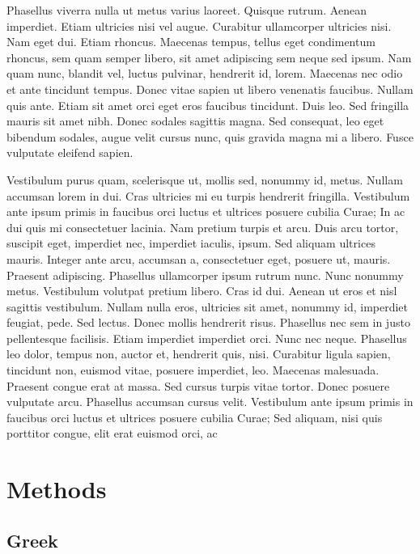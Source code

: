 \documentclass[]{cik}%
\begin{document}
Phasellus viverra nulla ut metus varius laoreet. Quisque rutrum. Aenean
imperdiet. Etiam ultricies nisi vel augue. Curabitur ullamcorper
ultricies nisi. Nam eget dui. Etiam rhoncus. Maecenas tempus, tellus
eget condimentum rhoncus, sem quam semper libero, sit amet adipiscing
sem neque sed ipsum. Nam quam nunc, blandit vel, luctus pulvinar,
hendrerit id, lorem. Maecenas nec odio et ante tincidunt tempus. Donec
vitae sapien ut libero venenatis faucibus. Nullam quis ante. Etiam sit
amet orci eget eros faucibus tincidunt. Duis leo. Sed fringilla mauris
sit amet nibh. Donec sodales sagittis magna. Sed consequat, leo eget
bibendum sodales, augue velit cursus nunc, quis gravida magna mi a
libero. Fusce vulputate eleifend sapien.

Vestibulum purus quam, scelerisque ut, mollis sed, nonummy id, metus.
Nullam accumsan lorem in dui. Cras ultricies mi eu turpis hendrerit
fringilla. Vestibulum ante ipsum primis in faucibus orci luctus et
ultrices posuere cubilia Curae; In ac dui quis mi consectetuer lacinia.
Nam pretium turpis et arcu. Duis arcu tortor, suscipit eget, imperdiet
nec, imperdiet iaculis, ipsum. Sed aliquam ultrices mauris. Integer ante
arcu, accumsan a, consectetuer eget, posuere ut, mauris. Praesent
adipiscing. Phasellus ullamcorper ipsum rutrum nunc. Nunc nonummy metus.
Vestibulum volutpat pretium libero. Cras id dui. Aenean ut eros et nisl
sagittis vestibulum. Nullam nulla eros, ultricies sit amet, nonummy id,
imperdiet feugiat, pede. Sed lectus. Donec mollis hendrerit risus.
Phasellus nec sem in justo pellentesque facilisis. Etiam imperdiet
imperdiet orci. Nunc nec neque. Phasellus leo dolor, tempus non, auctor
et, hendrerit quis, nisi. Curabitur ligula sapien, tincidunt non,
euismod vitae, posuere imperdiet, leo. Maecenas malesuada. Praesent
congue erat at massa. Sed cursus turpis vitae tortor. Donec posuere
vulputate arcu. Phasellus accumsan cursus velit. Vestibulum ante ipsum
primis in faucibus orci luctus et ultrices posuere cubilia Curae; Sed
aliquam, nisi quis porttitor congue, elit erat euismod orci, ac

\newpage

\hypertarget{methods}{%
\section{Methods}\label{methods}}

\hypertarget{greek}{%
\subsection{Greek}\label{greek}}
\end{document}
